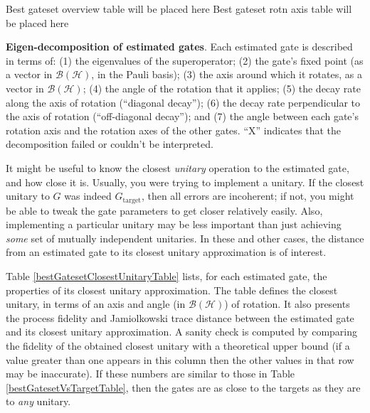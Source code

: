 \documentclass{article}[11pt]
\newcommand{\putfield}[2]{#2}
\begin{document}
\begin{table}[h]
\small
\begin{center}
\putfield{bestGatesetDecompTable}{Best gateset overview table will be placed here}
\vspace{2em}
\putfield{bestGatesetRotnAxisTable}{Best gateset rotn axis table will be placed here}
\caption{\textbf{Eigen-decomposition of estimated gates}.  Each estimated gate is described in terms of: (1) the eigenvalues of the superoperator; (2) the gate's fixed point (as a vector in $\mathcal{B}(\mathcal{H})$, in the Pauli basis); (3)  the axis around which it rotates, as a vector in $\mathcal{B}(\mathcal{H})$; (4) the angle of the rotation that it applies; (5) the decay rate along the axis of rotation (``diagonal decay''); (6) the decay rate perpendicular to the axis of rotation (``off-diagonal decay''); and (7) the angle between each gate's rotation axis and the rotation axes of the other gates.  ``X'' indicates that the decomposition failed or couldn't be interpreted. \label{bestGatesetDecompTable}}
\end{center}
\end{table}

It might be useful to know the closest \emph{unitary} operation to the estimated gate, and how close it is.  Usually, you were trying to implement a unitary.  If the closest unitary to $G$ was indeed $G_{\mathrm{target}}$, then all errors are incoherent; if not, you might be able to tweak the gate parameters to get closer relatively easily.  Also, implementing a particular unitary may be less important than just achieving \emph{some} set of mutually independent unitaries.  In these and other cases, the distance from an estimated gate to its closest unitary approximation is of interest.

Table \ref{bestGatesetClosestUnitaryTable} lists, for each estimated gate, the properties of its closest unitary approximation.  The table defines the closest unitary, in terms of an axis and angle (in $\mathcal{B}(\mathcal{H})$) of rotation.  It also presents the process fidelity and Jamiolkowski trace distance between the estimated gate and its closest unitary approximation.  A sanity check is computed by comparing the fidelity of the obtained closest unitary with a theoretical upper bound (if a value greater than one appears in this column then the other values in that row may be inaccurate).  If these numbers are similar to those in Table \ref{bestGatesetVsTargetTable}, then the gates are as close to the targets as they are to \emph{any} unitary.
\end{document}

